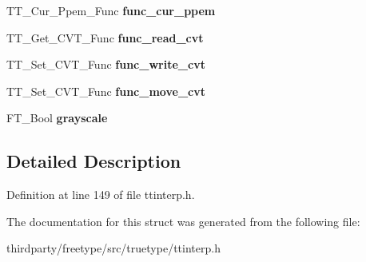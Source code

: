 \begin{DoxyCompactItemize}
\item 
\mbox{\label{struct_t_t___exec_context_rec___aa776c397d99d4332adbcba20f7f4cdc1}} 
T\+T\+\_\+\+Cur\+\_\+\+Ppem\+\_\+\+Func {\bfseries func\+\_\+cur\+\_\+ppem}
\item 
\mbox{\label{struct_t_t___exec_context_rec___a0a65a6393026e037f608b1e14bd144ac}} 
T\+T\+\_\+\+Get\+\_\+\+C\+V\+T\+\_\+\+Func {\bfseries func\+\_\+read\+\_\+cvt}
\item 
\mbox{\label{struct_t_t___exec_context_rec___aeb9e3b2d74d13513d06cbcb82b8039cf}} 
T\+T\+\_\+\+Set\+\_\+\+C\+V\+T\+\_\+\+Func {\bfseries func\+\_\+write\+\_\+cvt}
\item 
\mbox{\label{struct_t_t___exec_context_rec___a97902f83425631d26514e83352f31764}} 
T\+T\+\_\+\+Set\+\_\+\+C\+V\+T\+\_\+\+Func {\bfseries func\+\_\+move\+\_\+cvt}
\item 
\mbox{\label{struct_t_t___exec_context_rec___ac1f64528bb3710e5ad08bc0d3333011e}} 
F\+T\+\_\+\+Bool {\bfseries grayscale}
\end{DoxyCompactItemize}


\subsection{Detailed Description}


Definition at line 149 of file ttinterp.\+h.



The documentation for this struct was generated from the following file\+:\begin{DoxyCompactItemize}
\item 
thirdparty/freetype/src/truetype/ttinterp.\+h\end{DoxyCompactItemize}
